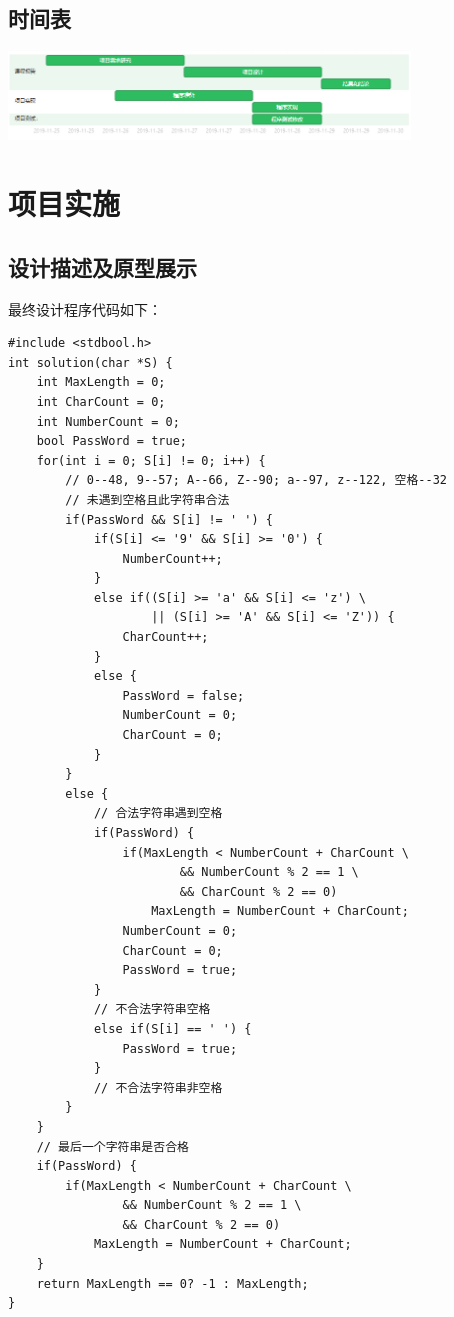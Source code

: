 \begin{spacing}{1.5}
\songti{}

    \subsection{时间表}
\begin{center}
\includegraphics[width=0.8\textwidth]{./gannt.png}
\end{center}

    \section{项目实施}
    \subsection{设计描述及原型展示}
    最终设计程序代码如下：
\begin{lstlisting}
#include <stdbool.h>
int solution(char *S) {
    int MaxLength = 0;
    int CharCount = 0;
    int NumberCount = 0;
    bool PassWord = true;
    for(int i = 0; S[i] != 0; i++) {
        // 0--48, 9--57; A--66, Z--90; a--97, z--122, 空格--32
        // 未遇到空格且此字符串合法
        if(PassWord && S[i] != ' ') {
            if(S[i] <= '9' && S[i] >= '0') {
                NumberCount++;
            }
            else if((S[i] >= 'a' && S[i] <= 'z') \
                    || (S[i] >= 'A' && S[i] <= 'Z')) {
                CharCount++;
            }
            else {
                PassWord = false;
                NumberCount = 0;
                CharCount = 0;
            }
        }
        else {
            // 合法字符串遇到空格
            if(PassWord) {
                if(MaxLength < NumberCount + CharCount \
                        && NumberCount % 2 == 1 \
                        && CharCount % 2 == 0)
                    MaxLength = NumberCount + CharCount;
                NumberCount = 0;
                CharCount = 0;
                PassWord = true;
            }
            // 不合法字符串空格
            else if(S[i] == ' ') {
                PassWord = true;
            }
            // 不合法字符串非空格
        }
    }
    // 最后一个字符串是否合格
    if(PassWord) {
        if(MaxLength < NumberCount + CharCount \
                && NumberCount % 2 == 1 \
                && CharCount % 2 == 0)
            MaxLength = NumberCount + CharCount;
    }
    return MaxLength == 0? -1 : MaxLength;
}
\end{lstlisting}


\end{spacing}

